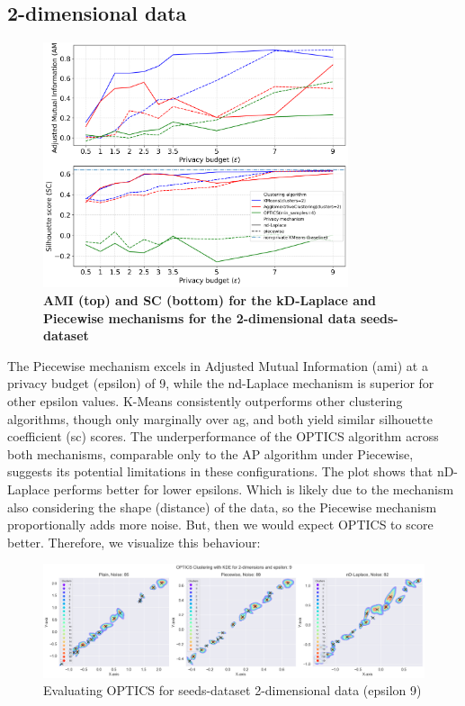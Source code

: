 \subsection{2-dimensional data}
\begin{figure}[H]
  \centering
  \caption{\textbf{AMI (top) and SC (bottom) for the kD-Laplace and Piecewise mechanisms for the 2-dimensional data seeds-dataset}}
  \includegraphics[width=0.8\textwidth]{Results/nd-laplace/nd-Laplace/seeds-dataset/ami-and-sc_2_dimensions.png}

  \label{fig:validation-seeds-dataset_comparison_2d-laplace}
\end{figure}
The Piecewise mechanism excels in Adjusted Mutual Information (\gls{ami}) at a privacy budget (epsilon) of 9, while the nd-Laplace mechanism is superior for other epsilon values. K-Means consistently outperforms other clustering algorithms, though only marginally over \gls{ag}, and both yield similar silhouette coefficient (\gls{sc}) scores. The underperformance of the OPTICS algorithm across both mechanisms, comparable only to the AP algorithm under Piecewise, suggests its potential limitations in these configurations.
\newpage
The plot shows that nD-Laplace performs better for lower epsilons. Which is likely due to the mechanism also considering the shape (distance) of the data, so the Piecewise mechanism proportionally adds more noise. But, then we would expect OPTICS to score better. Therefore, we visualize this behaviour:
\begin{figure}[H]
    \centering
    \includegraphics[width=1\linewidth]{Discussion/behaviour-2d-seeds-dataset&optics.png}
    \caption{Evaluating OPTICS for seeds-dataset 2-dimensional data (epsilon 9)}
    \label{fig:evaluate-optics-seeds-dataset-2d-9eps}
\end{figure}
